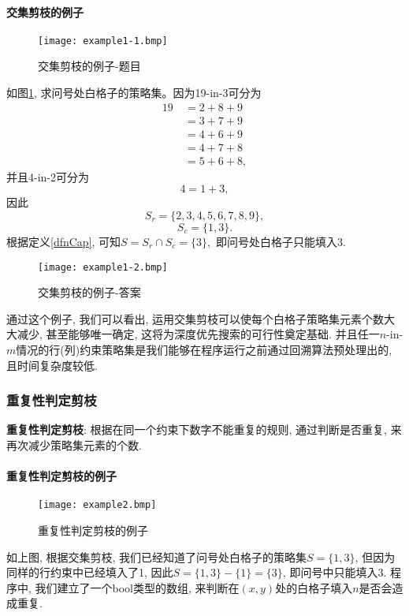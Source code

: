             \paragraph{交集剪枝的例子}
                \begin{figure}[htb]
                    \centering
                    \texttt{[image: example1-1.bmp]}
                    \caption[例1-1]{交集剪枝的例子-题目}\label{exm1-1}
                \end{figure}
                如图\ref{exm1-1}, 求问号处白格子的策略集。因为19-in-3可分为
                \begin{equation*}
                    \begin{split}
                        19\ & = 2+8+9\\
                            & = 3+7+9\\
                            & = 4+6+9\\
                            & = 4+7+8\\
                            & = 5+6+8,
                    \end{split}
                \end{equation*}
                并且4-in-2可分为
                \[4 = 1 + 3,\]
                因此\[S_{r}=\{2,3,4,5,6,7,8,9\},\] \[S_{c}=\{1,3\}.\]
                根据定义\ref{dfnCap}, 可知$S=S_{r} \cap S_{c}=\{3\},$
                即问号处白格子只能填入3.
                \begin{figure}[htb]
                    \centering
                    \texttt{[image: example1-2.bmp]}
                    \caption[例1-2]{交集剪枝的例子-答案}\label{exm1-2}
                \end{figure}

            通过这个例子, 我们可以看出, 运用交集剪枝可以使每个白格子策略集元素个数大大减少, 甚至能够唯一确定,
            这将为深度优先搜索的可行性奠定基础.
            并且任一$n$-in-$m$情况的行(列)约束策略集是我们能够在程序运行之前通过回溯算法预处理出的,
            且时间复杂度较低.

        \subsubsection{重复性判定剪枝}
            \label{dfnDup}\textbf{重复性判定剪枝}:
                根据在同一个约束下数字不能重复的规则, 通过判断是否重复, 来再次减少策略集元素的个数.
            \paragraph{重复性判定剪枝的例子}
                \begin{figure}[htb]
                    \centering
                    \texttt{[image: example2.bmp]}
                    \caption[例2]{重复性判定剪枝的例子}\label{exm2}
                \end{figure}
                如上图, 根据交集剪枝, 我们已经知道了问号处白格子的策略集$S=\{1,3\}$,
                但因为同样的行约束中已经填入了1, 因此$S=\{1,3\}-\{1\}=\{3\}$, 即问号中只能填入3.
                程序中, 我们建立了一个bool类型的数组, 来判断在$(x,y)$处的白格子填入$n$是否会造成重复.

